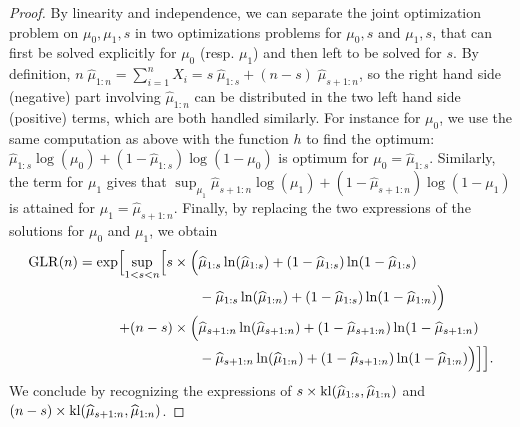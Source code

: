 \begin{proof}
    By linearity and independence, we can separate the joint optimization problem on $\mu_0,\mu_1,s$ in two optimizations problems for $\mu_0,s$ and $\mu_1,s$, that can first be solved explicitly for $\mu_0$ (resp. $\mu_1$) and then left to be solved for $s$.
    By definition, $n \; \widehat{\mu}_{1:n} = \sum_{i=1}^n X_i = s \;\widehat{\mu}_{1:s} + (n-s) \;\widehat{\mu}_{s+1:n}$, so the right hand side (negative) part involving $\widehat{\mu}_{1:n}$ can be distributed in the two left hand side (positive) terms,
    which are both handled similarly.
    For instance for $\mu_0$, we use the same computation as above with the function $h$ to find the optimum:
    $\widehat{\mu}_{1:s} \log(\mu_0) + (1 - \widehat{\mu}_{1:s}) \log(1-\mu_0)$
    is optimum for $\mu_0 = \widehat{\mu}_{1:s}$.
    Similarly, the term for $\mu_1$ gives that $\sup_{\mu_1} \widehat{\mu}_{s+1:n} \log(\mu_1) + (1 - \widehat{\mu}_{s+1:n}) \log(1-\mu_1)$
    is attained for $\mu_1 = \widehat{\mu}_{s+1:n}$.
    Finally, by replacing the two expressions of the solutions for $\mu_0$ and $\mu_1$,
    we obtain
    \begin{align*}
        \mathrm{GLR}(n)
        = \exp \Bigl[ \sup\limits_{1 < s < n} \Bigl[
            s \times \Bigl(
                    & \widehat{\mu}_{1:s} \ln(\widehat{\mu}_{1:s}) + (1 - \widehat{\mu}_{1:s}) \ln(1-\widehat{\mu}_{1:s}) \\
                    & - \widehat{\mu}_{1:s} \ln(\widehat{\mu}_{1:n}) + (1 - \widehat{\mu}_{1:s}) \ln(1-\widehat{\mu}_{1:n})
            \Bigr) \\
            + (n-s) \times \Bigl(
                & \widehat{\mu}_{s+1:n} \ln(\widehat{\mu}_{s+1:n}) + (1 - \widehat{\mu}_{s+1:n}) \ln(1-\widehat{\mu}_{s+1:n}) \\
                & - \widehat{\mu}_{s+1:n} \ln(\widehat{\mu}_{1:n}) + (1 - \widehat{\mu}_{s+1:n}) \ln(1-\widehat{\mu}_{1:n})
            \Bigr)
        \Bigr] \Bigr].
    \end{align*}
    We conclude by recognizing the expressions of $s \times \mathrm{kl}(\widehat{\mu}_{1:s}, \widehat{\mu}_{1:n})$
    and $(n-s) \times \mathrm{kl}(\widehat{\mu}_{s+1:n}, \widehat{\mu}_{1:n})$.
\end{proof}




